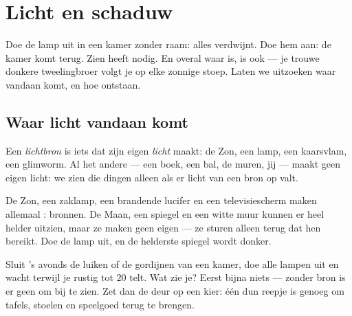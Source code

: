 \chapter{Licht en schaduw}\label{ch:g1:light-and-shadows}

Doe de lamp uit in een kamer zonder raam: alles verdwijnt. Doe hem
aan: de kamer komt terug. Zien heeft  nodig. En overal waar
 is, is ook  --- je trouwe donkere tweelingbroer
volgt je op elke zonnige stoep. Laten we uitzoeken waar 
vandaan komt, en hoe  ontstaan.

\section{Waar licht vandaan komt}

\begin{definition}[Lichtbronnen]\label{def:g1:light-and-shadows:source}
Een \emph{lichtbron} is iets dat zijn eigen
\emph{licht} maakt: de Zon, een lamp, een kaarsvlam, een
glimworm. Al het andere --- een boek, een bal, de muren, jij --- maakt
geen eigen licht: we zien die dingen alleen als er licht van een bron
op valt.
\end{definition}

\begin{example}\label{ex:g1:light-and-shadows:sources}
De Zon, een zaklamp, een brandende lucifer en een televisiescherm
maken allemaal : bronnen. De Maan, een spiegel en een witte muur
kunnen er heel helder uitzien, maar ze maken geen eigen
 --- ze sturen alleen  terug dat hen bereikt. Doe de lamp
uit, en de helderste spiegel wordt donker.
\end{example}

\begin{example}\label{ex:g1:light-and-shadows:darkroom}
Sluit 's avonds de luiken of de gordijnen van een kamer, doe alle
lampen uit en wacht terwijl je rustig tot $20$ telt. Wat zie je? Eerst
bijna niets --- zonder bron is er geen  om bij te zien. Zet dan
de deur op een kier: één dun reepje  is genoeg om tafels,
stoelen en speelgoed terug te brengen.
\end{example}


